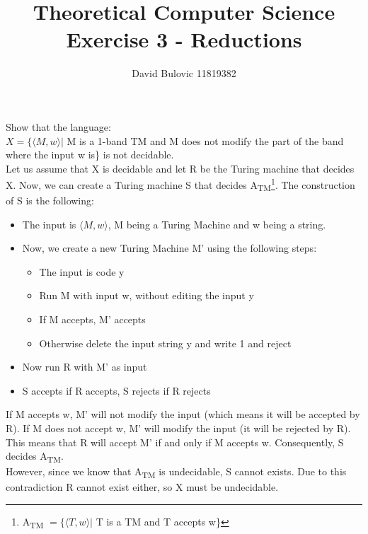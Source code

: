 \documentclass{article}
\title {Theoretical Computer Science\\Exercise 3 - Reductions}
\author {David Bulovic 11819382}
\date {}
\begin{document}
\maketitle

Show that the language: \\
\begin{math} X = \{ \langle M,w \rangle | \end{math} 
M is a 1-band TM and M does not modify the part of the band where the input w is\} 
is not decidable. \\

Let us assume that X is decidable and let R be the Turing machine that decides X. Now, we can create a Turing machine 
S that decides A\textsubscript{TM}\footnote{A\textsubscript{TM} \begin{math} = \{ \langle T,w \rangle | \end{math} T is a TM and T accepts w\}}.
The construction of S is the following:
\begin{itemize}
\item The input is \begin{math}\langle M,w \rangle\end{math}, M being a Turing Machine and w being a string.
\item Now, we create a new Turing Machine M' using the following steps:
\begin{itemize}
\item The input is code y
\item Run M with input w, without editing the input y
\item If M accepts, M' accepts
\item Otherwise delete the input string y and write 1 and reject
\end{itemize}
\item Now run R with M' as input
\item S accepts if R accepts, S rejects if R rejects
\end{itemize}
If M accepts w, M' will not modify the input (which means it will be accepted by R). If M does not accept w, M' will modify the input
(it will be rejected by R). This means that R will accept M' if and only if M accepts w. Consequently, S decides A\textsubscript{TM}.\\

However, since we know that A\textsubscript{TM} is undecidable, S cannot exists. 
Due to this contradiction R cannot exist either, so X must be undecidable.
\end{document}
